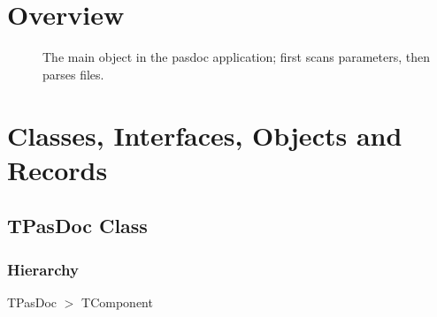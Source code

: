 \documentclass{report}
\newif\ifpdf
\begin{document}
\section{Overview}
\begin{description}
\item[\texttt{\begin{ttfamily}TPasDoc\end{ttfamily} Class}]The main object in the pasdoc application; first scans parameters, then parses files.
\end{description}
\section{Classes, Interfaces, Objects and Records}
\ifpdf
\subsection*{\large{\textbf{TPasDoc Class}}\normalsize\hspace{1ex}\hrulefill}
\else
\subsection*{TPasDoc Class}
\fi
\label{PasDoc_Base.TPasDoc}
\subsubsection*{\large{\textbf{Hierarchy}}\normalsize\hspace{1ex}\hfill}
TPasDoc {$>$} TComponent
\end{document}

